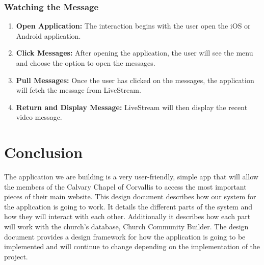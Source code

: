 \documentclass[letterpaper,10pt,draftclsnofoot,onecolumn,titlepage]{IEEEtran}
\begin{document}
			\subsubsection{Watching the Message}
				\begin{enumerate}
					\item \textbf{Open Application:} The interaction begins with the user open the iOS or Android application.
					\item \textbf{Click Messages:} After opening the application, the user will see the menu and choose the option to open the messages.
					\item \textbf{Pull Messages:} Once the user has clicked on the messages, the application will fetch the message from LiveStream.
					\item \textbf{Return and Display Message:} LiveStream will then display the recent video message.
				\end{enumerate}




	\section{Conclusion}
		The application we are building is a very user-friendly, simple app that will allow the members of the Calvary Chapel of Corvallis to access the most important pieces of their main website.
		This design document describes how our system for the application is going to work.
		It details the different parts of the system and how they will interact with each other.
		Additionally it describes how each part will work with the church's database, Church Community Builder.
		The design document provides a design framework for how the application is going to be implemented and will continue to change depending on the implementation of the project.
\end{document}
